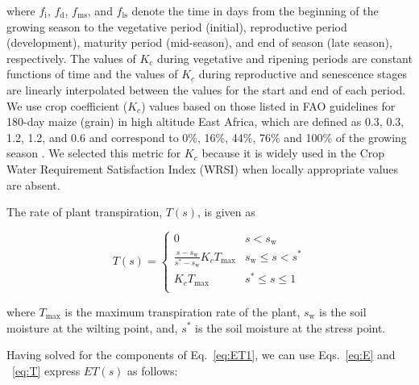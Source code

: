 \noindent
where $f_\text{i}$, $f_\text{d}$, $f_\text{ms}$, and $f_{\text{ls}}$ denote the time in days from the beginning of the growing season to the vegetative period (initial), reproductive period (development), maturity period (mid-season), and end of season (late season), respectively. The values of $K_c$ during vegetative and ripening periods are constant functions of time and the values of $K_c$ during reproductive and senescence stages are linearly interpolated between the values for the start and end of each period. We use crop coefficient ($K_c$) values based on those listed in FAO guidelines for 180-day maize (grain) in high altitude East Africa, which are defined as 0.3, 0.3, 1.2, 1.2, and 0.6 and correspond to 0\%, 16\%, 44\%, 76\% and 100\% of the growing season \cite{allen1998chapter}. We selected this metric for $K_c$ because it is widely used in the Crop Water Requirement Satisfaction Index (WRSI) \cite{senay2004crop} when locally appropriate values are absent. %

The rate of plant transpiration, $T(s)$, is given as

\begin{equation}
\label{eq:T}
    T(s) = \begin{cases}
        0   &   s < s_{\text{w}}  \\
        \frac{s - s_{\text{w}}}{s^* - s_{\text{w}}} K_c T_{\text{max}}    &   s_{\text{w}} \leq s < s^*  \\
        K_c T_{\text{max}}  &   s^* \leq s \leq 1 \\
    \end{cases}
\end{equation}

\noindent
where $T_{\text{max}}$ is the maximum transpiration rate of the plant, $s_{\text{w}}$ is the soil moisture at the wilting point, and, $s^{*}$ is the soil moisture at the stress point.

Having solved for the components of Eq.~\ref{eq:ET1}, we can use Eqs.~\ref{eq:E} and ~\ref{eq:T} express $ET(s)$ as follows:

